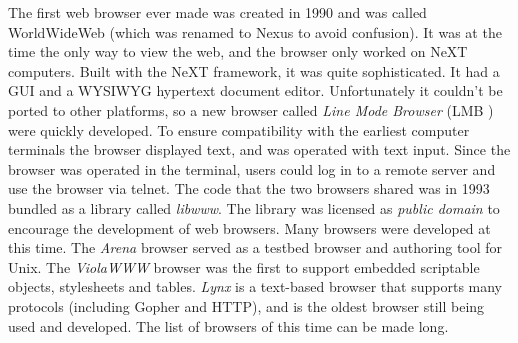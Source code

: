 \documentclass[a4paper,11pt]{kth-mag}
\newcommand\abbr[2][]{\uppercase{#2}\ifthenelse{\equal{#1}{}}%
                     {}{#1}}
\begin{document}
        The first \gls{web} \gls{browser} ever made was created in 1990 and was called WorldWideWeb (which was renamed to Nexus to avoid confusion).
        It was at the time the only way to view the \gls{web}, and the \gls{browser} only worked on NeXT computers.
        Built with the NeXT framework, it was quite sophisticated.
        It had a \gls{GUI} and a \gls{WYSIWYG} \gls{hypertext} document editor.
        Unfortunately it couldn't be ported to other platforms, so a new \gls{browser} called \emph{Line Mode Browser} (\abbr{lmb}) were quickly developed.
        To ensure compatibility with the earliest computer terminals the \gls{browser} displayed text, and was operated with text input.
        Since the \gls{browser} was operated in the terminal, users could log in to a remote server and use the \gls{browser} via telnet.
        The code that the two \glspl{browser} shared was in 1993 bundled as a library called \emph{libwww}.
        The library was licensed as \emph{public domain} to encourage the development of \gls{web} \glspl{browser}.
        Many \glspl{browser} were developed at this time.
        The \emph{Arena} \gls{browser} served as a testbed \gls{browser} and authoring tool for Unix.
        The \emph{ViolaWWW} \gls{browser} was the first to support embedded scriptable objects, stylesheets and tables.
        \emph{Lynx} is a text-based \gls{browser} that supports many protocols (including Gopher and \gls{HTTP}), and is the oldest \gls{browser} still being used and developed.
        The list of \glspl{browser} of this time can be made long.
\end{document}
